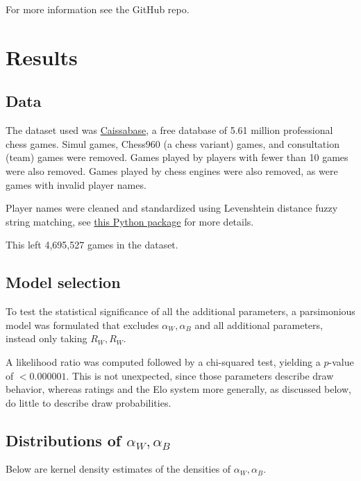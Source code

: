 \documentclass{article}
\begin{document}
For more information see the GitHub repo.

\section{Results}
\subsection{Data}
The dataset used was \href{http://caissabase.co.uk/}{Caissabase}, a free database of 5.61 million professional chess games.
Simul games, Chess960 (a chess variant) games, and consultation (team) games were removed.
Games played by players with fewer than 10 games were also removed.
Games played by chess engines were also removed, as were games with invalid player names.

Player names were cleaned and standardized using Levenshtein distance fuzzy string matching,
see \href{https://github.com/seatgeek/thefuzz}{this Python package} for more details.

This left 4,695,527 games in the dataset.

\subsection{Model selection}
To test the statistical significance of all the additional parameters, a parsimonious model
was formulated that excludes $\alpha_W,\alpha_B$ and all additional parameters, instead only
taking $R_W,R_W$.

A likelihood ratio was computed followed by a chi-squared test, yielding a $p$-value of $<0.000001$.
This is not unexpected, since those parameters describe draw behavior, whereas ratings and the Elo system more generally, as discussed
below, do little to describe draw probabilities.

\subsection{Distributions of $\alpha_W, \alpha_B$}

Below are kernel density estimates of the densities of $\alpha_W,\alpha_B$.
\end{document}
